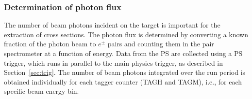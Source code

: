 %
%
%
%

\subsubsection{Determination of photon flux         \label{sec:ps_flux}}
The number of beam photons incident on the \GX{} target is
important for the extraction of cross sections. The photon flux
is determined by converting a known fraction of the photon beam to
$e^\pm$ pairs and counting them in the pair spectrometer at a function
of energy. Data from the PS are  collected using a PS trigger, which
runs in parallel to the  main \GX{} physics trigger, as described in
Section~\ref{sec:trig}. The number of beam photons integrated over
the run period is obtained individually for each tagger counter (TAGH
and TAGM), i.e., for each specific beam energy bin. 


